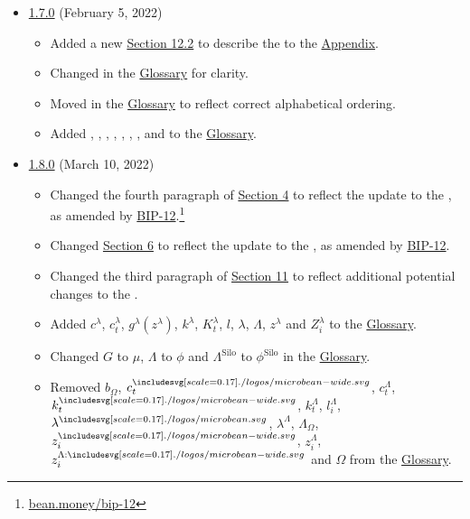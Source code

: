 \documentclass[class=article, crop=false]{standalone}
\begin{document}
\begin{itemize}[topsep=0pt, itemsep=3pt,leftmargin=16pt]
    \item \href{https://github.com/BeanstalkFarms/Beanstalk-Whitepaper/blob/master/version-history/beanstalk1_7_0.pdf}{1.7.0} (February 5, 2022)
    \begin{itemize}
        \item Added a new \hyperlink{subsection.12.2}{Section 12.2} to describe the  to the \hyperlink{section.14}{Appendix}.
        \item Changed  in the \hyperlink{subsection.14.11}{Glossary} for clarity. 
        \item Moved  in the \hyperlink{subsection.14.11}{Glossary} to reflect correct alphabetical ordering. 
        \item Added , , , , , , , and  to the \hyperlink{subsection.14.11}{Glossary}. 
    \end{itemize}
        \item \href{https://github.com/BeanstalkFarms/Beanstalk-Whitepaper/blob/master/version-history/beanstalk1_8_0.pdf}{1.8.0} (March 10, 2022)
    \begin{itemize}
        \item Changed the fourth paragraph of \hyperlink{section.4}{Section 4} to reflect the update to the , as amended by \href{https://bean.money/bip-12}{BIP-12}.\footnote{\href{https://bean.money/bip-12}{bean.money/bip-12}}
        \item Changed \hyperlink{section.6}{Section 6} to reflect the update to the , as amended by \href{https://bean.money/bip-12}{BIP-12}. 
        \item Changed the third paragraph of \hyperlink{section.11}{Section 11} to reflect additional potential changes to the . 
        \item Added  $c^{\lambda}$, $c_{t}^{\lambda}$, $g^{\lambda}(z^{\lambda})$, $k^{\lambda}$, $K_{t}^{\lambda}$, $l$, $\lambda$, $\Lambda$, $z^{\lambda}$ and $Z_i^{\lambda}$ to the \hyperlink{subsection.14.11}{Glossary}. 
        \item Changed $G$ to $\mu$, $\Lambda$ to $\phi$ and $\Lambda^{\text{Silo}}$ to $\phi^{\text{Silo}}$ in the \hyperlink{subsection.14.11}{Glossary}. 
        \item Removed $b_{\Omega}$, $c_{t}^{\bean}$, $c_{t}^{\Lambda}$, $k_{t}^{\bean}$, $k_{t}^{\Lambda}$, $l_{i}^{\Lambda}$, $\lambda^{\lambdabean}$, $\lambda^{\Lambda}$, ${\Lambda}_{\Omega}$, $z_{i}^{\bean}$, $z_{i}^{\Lambda}$, $z_{i}^{\Lambda:\bean}$ and $\Omega$ from the \hyperlink{subsection.14.11}{Glossary}.

\end{itemize}
\end{itemize}
\end{document}

